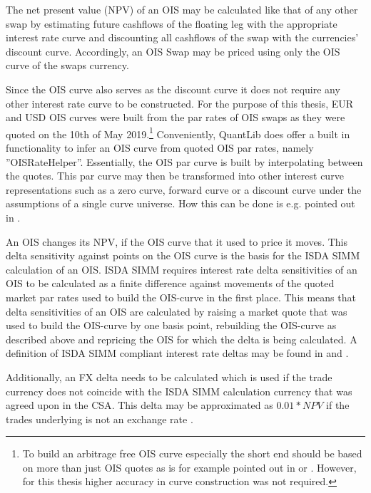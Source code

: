 \documentclass[../Thesis_AHoecherl.tex]{subfiles}
\begin{document}
    The net present value (\gls{NPV}) of an \gls{OIS} may be calculated like that of any other swap by estimating future cashflows of the floating leg with the appropriate interest rate curve and discounting all cashflows of the swap with the currencies' discount curve.
    Accordingly, an \gls{OIS} Swap may be priced using only the \gls{OIS} curve of the swaps currency.

    Since the \gls{OIS} curve also serves as the discount curve it does not require any other interest rate curve to be constructed. 
    For the purpose of this thesis, EUR and USD \gls{OIS} curves were built from the par rates of \gls{OIS} swaps as they were quoted on the 10th of May 2019.\footnote{To build an arbitrage free \gls{OIS} curve especially the short end should be based on more than just \gls{OIS} quotes as is for example pointed out in \cite{ametrano2013everything} or \cite{brugger2018valuation}. However, for this thesis higher accuracy in curve construction was not required.}
    Conveniently, QuantLib does offer a built in functionality to infer an \gls{OIS} curve from quoted \gls{OIS} par rates, namely ''OISRateHelper''. Essentially, the \gls{OIS} par curve is built by interpolating between the quotes.
    This par curve may then be transformed into other interest curve representations such as a zero curve, forward curve or a discount curve under the assumptions of a single curve universe. How this can be done is e.g. pointed out in \cite[Chapter 4]{hull2009options}.

    An \gls{OIS} changes its \gls{NPV}, if the \gls{OIS} curve that it used to price it moves.
    This delta sensitivity against points on the \gls{OIS} curve is the basis for the \gls{ISDA SIMM} calculation of an \gls{OIS}.
    \gls{ISDA SIMM} requires interest rate delta sensitivities of an \gls{OIS} to be calculated as a finite difference against movements of the quoted market par rates used to build the \gls{OIS}-curve in the first place. 
    This means that delta sensitivities of an \gls{OIS} are calculated by raising a market quote that was used to build the \gls{OIS}-curve by one basis point, rebuilding the \gls{OIS}-curve as described above and repricing the \gls{OIS} for which the delta is being calculated.
    A definition of \gls{ISDA SIMM} compliant interest rate deltas may be found in \cite[Point 22]{SIMM} and \cite[Section 2.2]{RiskDataStandard}.
    
    Additionally, an FX delta needs to be calculated which is used if the trade currency does not coincide with the \gls{ISDA SIMM} calculation currency that was agreed upon in the \gls{CSA}. This delta may be approximated as $0.01 * NPV$ if the trades underlying is not an exchange rate \cite[Section 2.7]{RiskDataStandard}.
\end{document}
